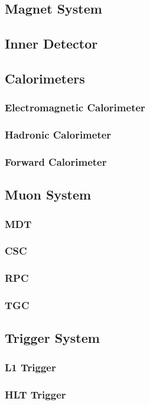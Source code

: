 \subsection{Magnet System}
\subsection{Inner Detector}
\subsection{Calorimeters}
\subsubsection{Electromagnetic Calorimeter}
\subsubsection{Hadronic Calorimeter}
\subsubsection{Forward Calorimeter}
\subsection{Muon System}
\subsubsection{MDT} %
\subsubsection{CSC} %
\subsubsection{RPC}
\subsubsection{TGC}
\subsection{Trigger System}
\subsubsection{L1 Trigger}
\subsubsection{HLT Trigger}
